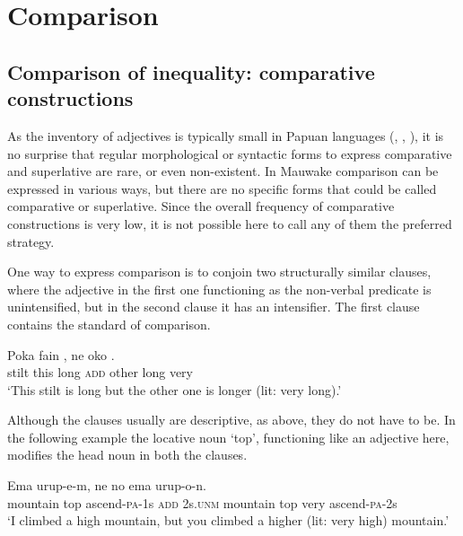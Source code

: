 \section{Comparison} \label{sec:6.5}

\subsection{Comparison of inequality: comparative constructions}

As the inventory of adjectives is typically small in Papuan languages (\citealt[268]{Haiman1980}, \citealt[63]{Reesink1987}, \citealt[105--107]{MacDonald1990}), it is no surprise that regular morphological or syntactic forms to express comparative and superlative are rare, or even non-existent. In Mauwake comparison can be expressed in various ways, but there are no specific forms that could be called comparative or superlative. Since the overall frequency of comparative constructions is very low, it is not possible here to call any of them the preferred strategy.

One way to express comparison is to conjoin two structurally similar clauses, where the adjective in the first one functioning as the non-verbal predicate is unintensified, but in the second clause it has an intensifier. The first clause contains the standard of comparison. 

\ea%
\label{ex:6:x1336}
\gll Poka  fain  ,  ne  oko    . \\
stilt  this  long  \textsc{add}  other  long  very\\
\glt `This stilt is long but the other one is longer (lit: very long).'
\z

Although the clauses usually are descriptive, as above, they do not have to be. In the following example the locative noun  `top', functioning like an adjective here, modifies the head noun in both the clauses.  

\ea%
\label{ex:6:x1324}
\gll Ema   urup-e-m,  ne  no  ema     urup-o-n.\\
mountain  top  ascend-\textsc{pa}-1s  \textsc{add}  2s.\textsc{unm}  mountain top  very  ascend-\textsc{pa}-2s\\
\glt `I climbed a high mountain, but you climbed a higher (lit: very high) mountain.'
\z

